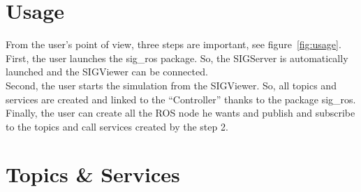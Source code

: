 \section{Usage}
From the user's point of view, three steps are important, see figure~\ref{fig:usage}.\\
First, the user launches the sig\_ros package. So, the SIGServer is automatically launched and the SIGViewer can be connected.\\
Second, the user starts the simulation from the SIGViewer. So, all topics and services are created and linked to the ``Controller'' thanks to the package sig\_ros.\\
Finally, the user can create all the ROS node he wants and publish and subscribe to the topics and call services created by the step 2.

\noindent\begin{minipage}{\linewidth}%
\label{fig:usage}%
\end{minipage}

\section{Topics \& Services}
